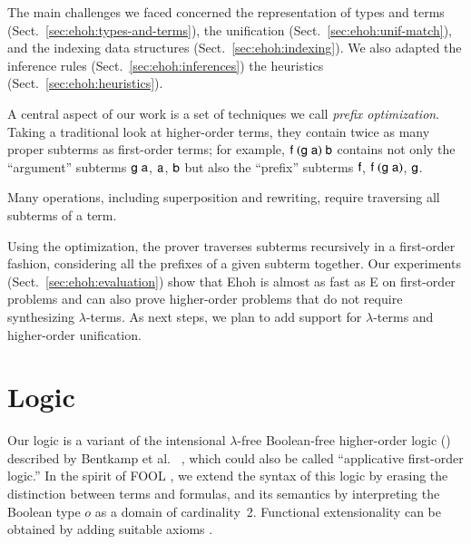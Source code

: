 The main challenges we faced concerned the
representation of types and terms
(Sect.~\ref{sec:ehoh:types-and-terms}), the unification
(Sect.~\ref{sec:ehoh:unif-match}), and the indexing data structures
(Sect.~\ref{sec:ehoh:indexing}). We also adapted the
inference rules (Sect.~\ref{sec:ehoh:inferences}) the
heuristics (Sect.~\ref{sec:ehoh:heuristics}).

A central aspect of our work is a set of techniques we call
\emph{prefix optimization}. Taking a traditional look at higher-order terms, they contain twice as many proper
subterms as first-order terms; for example,
$\mathsf{f}\;(\mathsf{g}\;\mathsf{a})\;\mathsf{b}$ contains not only the ``argument'' subterms
$\mathsf{g}\;\mathsf{a}$, $\mathsf{a}$, $\mathsf{b}$ but also the ``prefix'' subterms
$\mathsf{f}$, $\mathsf{f}\;(\mathsf{g}\;\mathsf{a})$, $\mathsf{g}$.
\begin{rep}Many operations, including superposition and rewriting, require
traversing all subterms of a term.\end{rep}
Using the optimization, the prover traverses subterms recursively in a
first-order fashion, considering all the prefixes of a given subterm
together. %
%
Our experiments (Sect.~\ref{sec:ehoh:evaluation}) show that Ehoh is
almost as fast as E on first-order problems and can also prove
higher-order problems that do not require synthesizing
$\lambda$-terms. As next steps, we plan to add support for
$\lambda$-terms and higher-order unification.

\section{Logic}
\label{sec:ehoh:logic}

Our logic is a variant of the intensional $\lambda$-free Boolean-free higher-order
logic (\lfhol{}) described by Bentkamp et al.\ %
\cite[Sect.~2]{bbcw-21-lfho}, which could also be called ``applicative
first-order logic.'' In the spirit of FOOL \cite{kotelnikov-16-fool}, we
extend the syntax of this logic by erasing the distinction between terms and
formulas, and its semantics by interpreting the Boolean type $o$ as a domain
of cardinality~2. Functional extensionality can be obtained by adding
suitable axioms \cite[Sect.~3.1]{bbcw-21-lfho}.


